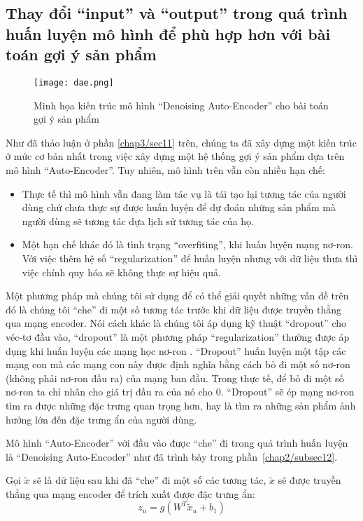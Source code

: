     \subsection{Thay đổi ``input'' và ``output'' trong quá trình huấn luyện mô hình để phù hợp hơn với bài toán gợi ý sản phẩm}
    \label{DAE_recsys}
    \begin{figure}
        \centering
        \texttt{[image: dae.png]}
        \caption{Minh họa kiến trúc mô hình ``Denoising Auto-Encoder'' cho bài toán gợi ý sản phẩm}
        \label{fig_recdae}
    \end{figure}
    Như đã thảo luận ở phần \ref{chap3/sec11} trên, chúng ta đã xây dựng một kiến trúc ở mức cơ bản nhất trong việc xây dựng một hệ thống gợi ý sản phẩm dựa trên mô hình ``Auto-Encoder''.
    Tuy nhiên, mô hình trên vẫn còn nhiều hạn chế: 
    \begin{itemize}
        \item Thực tế thì mô hình vẫn đang làm tác vụ là tái tạo lại tương tác của người dùng chứ chưa thực sự được huấn luyện để dự đoán những sản phẩm mà người dùng sẽ tương tác dựa lịch sử tương tác của họ.
        \item Một hạn chế khác đó là tình trạng ``overfiting'', khi huấn luyện mạng nơ-ron. Với việc thêm hệ số ``regularization'' để huấn luyện nhưng với dữ liệu thưa thì việc chính quy hóa sẽ không thực sự hiệu quả. 
    \end{itemize}
    
    Một phương pháp mà chúng tôi sử dụng để có thể giải quyết những vấn đề trên đó là chúng tôi ``che'' đi một số tương tác trước khi dữ liệu được truyền thẳng qua mạng encoder. 
    Nói cách khác là chúng tôi áp dụng kỹ thuật ``dropout'' cho véc-tơ đầu vào, ``dropout'' là một phương pháp ``regularization'' thường được áp dụng khi huấn luyện các mạng học nơ-ron \cite{Goodfellow-et-al-2016-Book}.
    ``Dropout'' huấn luyện một tập các mạng con mà các mạng con này được định nghĩa bằng cách bỏ đi một số nơ-ron (không phải nơ-ron đầu ra) của mạng ban đầu. 
    Trong thực tế, để bỏ đi một số nơ-ron ta chỉ nhân cho giá trị đầu ra của nó cho 0. 
    ``Dropout'' sẽ ép mạng nơ-ron tìm ra được những đặc trưng quan trọng hơn, hay là tìm ra những sản phẩm ảnh hưởng lớn đến đặc trưng ẩn của người dùng. 
    
    Mô hình ``Auto-Encoder'' với đầu vào được ``che'' đi trong quá trình huấn luyện là ``Denoising Auto-Encoder'' như đã trình bày trong phần~\ref{chap2/subsec12}.

    Gọi $\tilde{x}$ sẽ là dữ liệu sau khi đã ``che'' đi một số các tương tác, $\tilde{x}$ sẽ được truyền thẳng qua mạng encoder để trích xuất được đặc trưng ẩn:
    \begin{equation}
        \label{z_u_with_x_tilde}
        z_u = g(W^T \tilde{x}_u + b_1)
    \end{equation}
    
